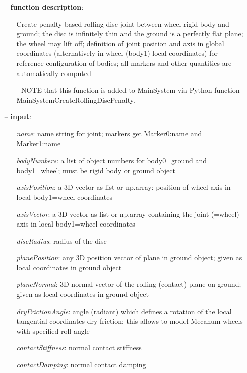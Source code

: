 \begin{itemize}[leftmargin=0.7cm]
\item[--]
{\bf function description}: \vspace{-6pt}
\begin{itemize}[leftmargin=1.2cm]
\setlength{\itemindent}{-0.7cm}
\item[]Create penalty-based rolling disc joint between wheel rigid body and ground; the disc is infinitely thin and the ground is a perfectly flat plane; the wheel may lift off; definition of joint position and axis in global coordinates (alternatively in wheel (body1) local coordinates) for reference configuration of bodies; all markers and other quantities are automatically computed
\item[]- NOTE that this function is added to MainSystem via Python function MainSystemCreateRollingDiscPenalty.
\end{itemize}
\item[--]
{\bf input}: \vspace{-6pt}
\begin{itemize}[leftmargin=1.2cm]
\setlength{\itemindent}{-0.7cm}
\item[]{\it name}: name string for joint; markers get Marker0:name and Marker1:name
\item[]{\it bodyNumbers}: a list of object numbers for body0=ground and body1=wheel; must be rigid body or ground object
\item[]{\it axisPosition}: a 3D vector as list or np.array: position of wheel axis in local body1=wheel coordinates
\item[]{\it axisVector}: a 3D vector as list or np.array containing the joint (=wheel) axis in local body1=wheel coordinates
\item[]{\it discRadius}: radius of the disc
\item[]{\it planePosition}: any 3D position vector of plane in ground object; given as local coordinates in ground object
\item[]{\it planeNormal}: 3D normal vector of the rolling (contact) plane on ground; given as local coordinates in ground object
\item[]{\it dryFrictionAngle}: angle (radiant) which defines a rotation of the local tangential coordinates dry friction; this allows to model Mecanum wheels with specified roll angle
\item[]{\it contactStiffness}: normal contact stiffness
\item[]{\it contactDamping}: normal contact damping

\end{itemize}
\end{itemize}
